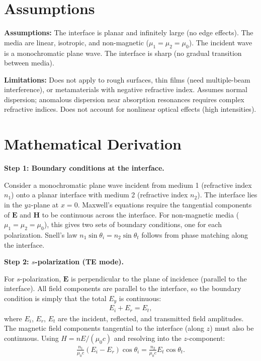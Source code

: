 \documentclass[11pt,openright]{book}
\begin{document}
\section*{Assumptions}

\textbf{Assumptions:} The interface is planar and infinitely large (no edge effects). The media are linear, isotropic, and non-magnetic ($\mu_1 = \mu_2 = \mu_0$). The incident wave is a monochromatic plane wave. The interface is sharp (no gradual transition between media).


\textbf{Limitations:} Does not apply to rough surfaces, thin films (need multiple-beam interference), or metamaterials with negative refractive index. Assumes normal dispersion; anomalous dispersion near absorption resonances requires complex refractive indices. Does not account for nonlinear optical effects (high intensities).


\section*{Mathematical Derivation}

\textbf{Step 1: Boundary conditions at the interface.}

Consider a monochromatic plane wave incident from medium 1 (refractive index $n_1$) onto a planar interface with medium 2 (refractive index $n_2$). The interface lies in the $yz$-plane at $x = 0$. Maxwell's equations require the tangential components of $\mathbf{E}$ and $\mathbf{H}$ to be continuous across the interface. For non-magnetic media ($\mu_1 = \mu_2 = \mu_0$), this gives two sets of boundary conditions, one for each polarization. Snell's law $n_1\sin\theta_i = n_2\sin\theta_t$ follows from phase matching along the interface.

\textbf{Step 2: $s$-polarization (TE mode).}

For $s$-polarization, $\mathbf{E}$ is perpendicular to the plane of incidence (parallel to the interface). All field components are parallel to the interface, so the boundary condition is simply that the total $E_y$ is continuous:
\begin{align}
E_i + E_r = E_t, \tag{1}
\end{align}
where $E_i$, $E_r$, $E_t$ are the incident, reflected, and transmitted field amplitudes. The magnetic field components tangential to the interface (along $z$) must also be continuous. Using $H = nE/(\mu_0 c)$ and resolving into the $z$-component:
\begin{align}
\frac{n_1}{\mu_0 c}(E_i - E_r)\cos\theta_i = \frac{n_2}{\mu_0 c}E_t\cos\theta_t. \tag{2}
\end{align}
\end{document}
